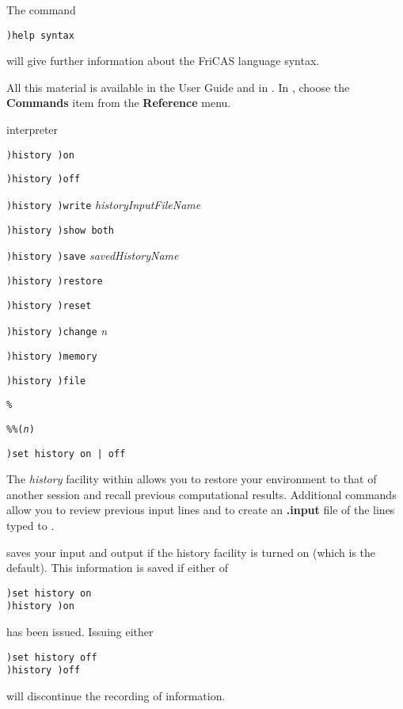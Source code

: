 The command
\begin{verbatim}
)help syntax
\end{verbatim}
will give further information about the FriCAS language syntax.

All this material is available in the \Language{} User Guide
and in \HyperName{}.
In \HyperName{}, choose the {\bf Commands} item from the
{\bf Reference} menu.





\par{} interpreter

\par{}
\begin{simpleList}
\item{\tt )history )on}
\item{\tt )history )off}
\item{\tt )history )write} {\it historyInputFileName}
\item{\tt )history )show \ranb{} \lanb{}both\ranb{}}
\item{\tt )history )save} {\it savedHistoryName}
\item{\tt )history )restore} \ranb{}
\item{\tt )history )reset}
\item{\tt )history )change} {\it n}
\item{\tt )history )memory}
\item{\tt )history )file}
\item{\tt \%}
\item{\tt \%\%({\it n})}
\item{\tt )set history on | off}
\end{simpleList}

\par{}

The {\it history} facility within \Language{} allows you to restore your
environment to that of another session and recall previous
computational results.
Additional commands allow you to review previous
input lines and to create an {\bf .input} file of the lines typed to
\Language{}.

\Language{} saves your input and output if the history facility is
turned on (which is the default).
This information is saved if either of
\begin{verbatim}
)set history on
)history )on
\end{verbatim}
has been issued.
Issuing either
\begin{verbatim}
)set history off
)history )off
\end{verbatim}
will discontinue the recording of information.

